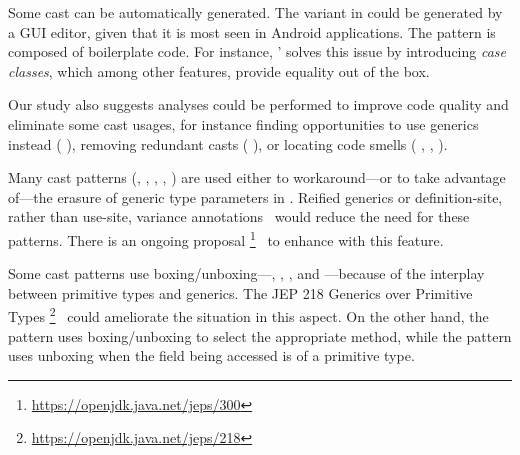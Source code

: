 Some cast can be automatically generated.
The  variant in  could be generated by a GUI editor,
given that it is most seen in Android applications.
The  pattern is composed of boilerplate code.
For instance, \scala{}' solves this issue by introducing \emph{case classes},
which among other features, provide equality out of the box.

Our study also suggests analyses could be performed to improve code quality and eliminate some cast usages,
for instance finding opportunities to use generics instead (\cf{} ),
removing redundant casts (\cf{} ),
or locating code smells (\cf{}
,
,
).

Many cast patterns (\eg, 
,
,
,
)
are used either to 
workaround---or to take advantage of---the erasure of generic type parameters in \java{}.
Reified generics or definition-site, rather than use-site,
variance annotations~\citep{altidorTamingWildcardsCombining2011}
would reduce the need for these patterns.
There is an ongoing proposal%
\footnote{\url{https://openjdk.java.net/jeps/300}}~\citep{jep300}
to enhance \java{} with this feature.

Some cast patterns use boxing/unboxing---\ie{},
,
, and
---because of the interplay between primitive types and generics.
The JEP 218 Generics over Primitive Types%
\footnote{\url{https://openjdk.java.net/jeps/218}}~\citep{jep218}
could ameliorate the situation in this aspect.
On the other hand, 
the  pattern uses boxing/unboxing to select the appropriate method,
while the  pattern
uses unboxing when the field being accessed is of a primitive type.
